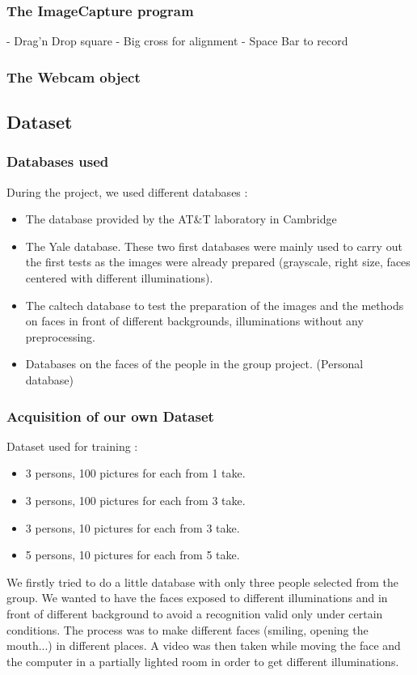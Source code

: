 \subsubsection{The ImageCapture program}
- Drag'n Drop square
- Big cross for alignment
- Space Bar to record

\subsubsection{The Webcam object}

\subsection{Dataset}
\subsubsection{Databases used}
During the project, we used different databases :
\begin{itemize}
 \item The database provided by the AT\&T laboratory in Cambridge
\item The Yale database. These two first databases were mainly used to carry out the first tests as the images were already prepared (grayscale, right size, faces centered with different illuminations).
\item The caltech database to test the preparation of the images and the methods on faces in front of different backgrounds, illuminations without any preprocessing.
\item Databases on the faces of the people in the group project. (Personal database)
\end{itemize}
\subsubsection{Acquisition of our own Dataset}
Dataset used for training :
\begin{itemize}
 \item 3 persons, 100 pictures for each from 1 take.  
\item 3 persons, 100 pictures for each from 3 take.
\item 3 persons, 10 pictures for each from 3 take.
\item 5 persons, 10 pictures for each from 5 take.
\end{itemize}
We firstly tried to do a little database with only three people selected from the group. We wanted to have the faces exposed to different illuminations and in front of different background to avoid a recognition valid only under certain conditions. The process was to make different faces (smiling, opening the mouth...) in different places. A video was then taken while moving the face and the computer in a partially lighted room in order to get different illuminations. 

